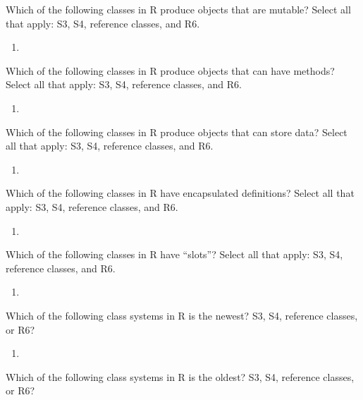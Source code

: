 \documentclass[
  12pt,
  krantz2]{krantz}
\providecommand{\tightlist}{%
  \setlength{\itemsep}{0pt}\setlength{\parskip}{0pt}}
\begin{document}
Which of the following classes in R produce objects that are mutable? Select all that apply: S3, S4, reference classes, and R6.

\begin{enumerate}
\def\labelenumi{\arabic{enumi}.}
\setcounter{enumi}{1}
\tightlist
\item
\end{enumerate}

Which of the following classes in R produce objects that can have methods? Select all that apply: S3, S4, reference classes, and R6.

\begin{enumerate}
\def\labelenumi{\arabic{enumi}.}
\setcounter{enumi}{2}
\tightlist
\item
\end{enumerate}

Which of the following classes in R produce objects that can store data? Select all that apply: S3, S4, reference classes, and R6.

\begin{enumerate}
\def\labelenumi{\arabic{enumi}.}
\setcounter{enumi}{3}
\tightlist
\item
\end{enumerate}

Which of the following classes in R have encapsulated definitions? Select all that apply: S3, S4, reference classes, and R6.

\begin{enumerate}
\def\labelenumi{\arabic{enumi}.}
\setcounter{enumi}{4}
\tightlist
\item
\end{enumerate}

Which of the following classes in R have ``slots''? Select all that apply: S3, S4, reference classes, and R6.

\begin{enumerate}
\def\labelenumi{\arabic{enumi}.}
\setcounter{enumi}{5}
\tightlist
\item
\end{enumerate}

Which of the following class systems in R is the newest? S3, S4, reference classes, or R6?

\begin{enumerate}
\def\labelenumi{\arabic{enumi}.}
\setcounter{enumi}{6}
\tightlist
\item
\end{enumerate}

Which of the following class systems in R is the oldest? S3, S4, reference classes, or R6?
\end{document}

